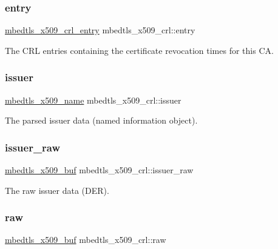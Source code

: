 \subsubsection{\texorpdfstring{entry}{entry}}
{\footnotesize\ttfamily \hyperlink{structmbedtls__x509__crl__entry}{mbedtls\+\_\+x509\+\_\+crl\+\_\+entry} mbedtls\+\_\+x509\+\_\+crl\+::entry}

The C\+RL entries containing the certificate revocation times for this CA. \mbox{\label{structmbedtls__x509__crl_aae988566d13fadf805d8ad31d13b44d8}} 
\subsubsection{\texorpdfstring{issuer}{issuer}}
{\footnotesize\ttfamily \hyperlink{group__x509__module_ga2272228c7776102328df31623af3168c}{mbedtls\+\_\+x509\+\_\+name} mbedtls\+\_\+x509\+\_\+crl\+::issuer}

The parsed issuer data (named information object). \mbox{\label{structmbedtls__x509__crl_a009d0e1b844df85a2389ec10b770a6f6}} 
\subsubsection{\texorpdfstring{issuer\+\_\+raw}{issuer\_raw}}
{\footnotesize\ttfamily \hyperlink{group__x509__module_ga4d02c9e8e4e2934555e0d132cd2976dc}{mbedtls\+\_\+x509\+\_\+buf} mbedtls\+\_\+x509\+\_\+crl\+::issuer\+\_\+raw}

The raw issuer data (D\+ER). \mbox{\label{structmbedtls__x509__crl_a6fb756d2b65237ccaff6061f4217b2eb}} 
\subsubsection{\texorpdfstring{raw}{raw}}
{\footnotesize\ttfamily \hyperlink{group__x509__module_ga4d02c9e8e4e2934555e0d132cd2976dc}{mbedtls\+\_\+x509\+\_\+buf} mbedtls\+\_\+x509\+\_\+crl\+::raw}

